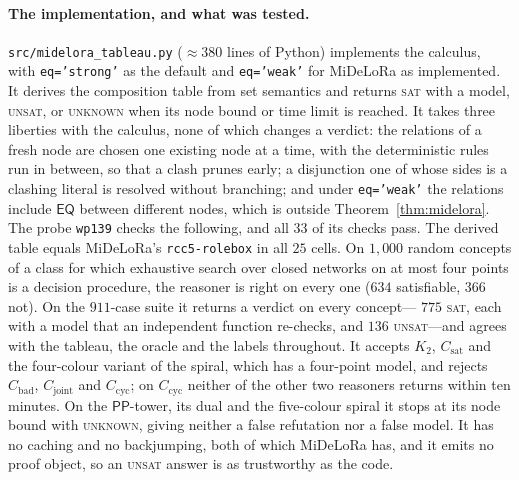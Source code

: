 \documentclass[11pt]{article}
\newcommand{\PP}{\mathsf{PP}}
\newcommand{\EQ}{\mathsf{EQ}}
\newcommand{\code}[1]{\texttt{#1}}
\theoremstyle{plain}
\theoremstyle{definition}
\begin{document}
\paragraph{The implementation, and what was tested.}
\texttt{src/midelora\_tableau.py} ($\approx 380$ lines of Python) implements
the calculus, with \code{eq='strong'} as the default and \code{eq='weak'} for
MiDeLoRa as implemented. It derives the composition table from set semantics
and returns \textsc{sat} with a model, \textsc{unsat}, or \textsc{unknown}
when its node bound or time limit is reached. It takes three liberties with
the calculus, none of which changes a verdict: the relations of a fresh node
are chosen one existing node at a time, with the deterministic rules run in
between, so that a clash prunes early; a disjunction one of whose sides is a
clashing literal is resolved without branching; and under \code{eq='weak'} the
relations include $\EQ$ between different nodes, which is outside
Theorem~\ref{thm:midelora}. The probe \texttt{wp139} checks the following, and
all $33$ of its checks pass. The derived table equals MiDeLoRa's
\code{rcc5-rolebox} in all $25$ cells. On $1{,}000$ random concepts of a class
for which exhaustive search over closed networks on at most four points is a
decision procedure, the reasoner is right on every one ($634$ satisfiable,
$366$ not). On the $911$-case suite it returns a verdict on every concept---
$775$ \textsc{sat}, each with a model that an independent function re-checks,
and $136$ \textsc{unsat}---and agrees with the tableau, the oracle and the
labels throughout. It accepts $K_2$, $C_{\mathrm{sat}}$ and the four-colour
variant of the spiral, which has a four-point model, and rejects
$C_{\mathrm{bad}}$, $C_{\mathrm{joint}}$ and $C_{\mathrm{cyc}}$; on
$C_{\mathrm{cyc}}$ neither of the other two reasoners returns within ten
minutes. On the $\PP$-tower, its dual and the five-colour spiral it stops at
its node bound with \textsc{unknown}, giving neither a false refutation nor a
false model. It has no caching and no backjumping, both of which MiDeLoRa has,
and it emits no proof object, so an \textsc{unsat} answer is as trustworthy as
the code.
\end{document}
